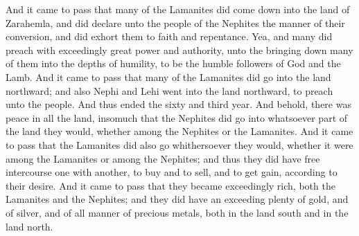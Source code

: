 And it came to pass that many of the Lamanites did come down into the land of Zarahemla, and did declare unto the people of the Nephites the manner of their conversion, and did exhort them to faith and repentance.
\bverse \iffalse Yea, and many did preach with exceedingly great power and authority, unto the bringing down many of them into the depths of humility, to be the humble followers of God and the Lamb. \fi
Yea, and many did preach with exceedingly great power and authority, unto the bringing down many of them into the depths of humility, to be the humble followers of God and the Lamb.
\bverse \iffalse And it came to pass that many of the Lamanites did go into the land northward; and also Nephi and Lehi went into the land northward, to preach unto the people. And thus ended the sixty and third year. \fi
And it came to pass that many of the Lamanites did go into the land northward; and also Nephi and Lehi went into the land northward, to preach unto the people. And thus ended the sixty and third year.
\bverse \iffalse And behold, there was peace in all the land, insomuch that the Nephites did go into whatsoever part of the land they would, whether among the Nephites or the Lamanites. \fi
And behold, there was peace in all the land, insomuch that the Nephites did go into whatsoever part of the land they would, whether among the Nephites or the Lamanites.
\bverse \iffalse And it came to pass that the Lamanites did also go whithersoever they would, whether it were among the Lamanites or among the Nephites; and thus they did have free intercourse one with another, to buy and to sell, and to get gain, according to their desire. \fi
And it came to pass that the Lamanites did also go whithersoever they would, whether it were among the Lamanites or among the Nephites; and thus they did have free intercourse one with another, to buy and to sell, and to get gain, according to their desire.
\bverse \iffalse And it came to pass that they became exceedingly rich, both the Lamanites and the Nephites; and they did have an exceeding plenty of gold, and of silver, and of all manner of precious metals, both in the land south and in the land north. \fi
And it came to pass that they became exceedingly rich, both the Lamanites and the Nephites; and they did have an exceeding plenty of gold, and of silver, and of all manner of precious metals, both in the land south and in the land north.
\bverse \iffalse Now the land south was called Lehi and the land north was called Mulek, which was after the son of Zedekiah; for the Lord did bring Mulek into the land north, and Lehi into the land south. \fi
